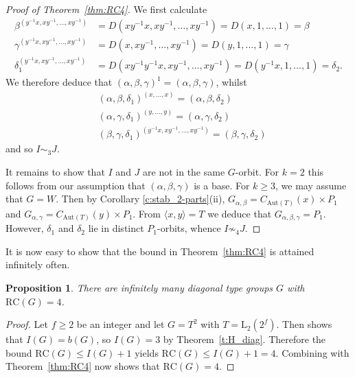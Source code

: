 \documentclass[twoside,a4paper,reqno,11pt]{amsart}
\newcommand{\RC}{\mathrm{RC}}
\renewcommand{\b}{\beta}
\newcommand{\g}{\gamma}
\newcommand{\<}{\langle}
\renewcommand{\>}{\rangle}
\newcommand{\leqs}{\leqslant}
\newcommand{\geqs}{\geqslant}
\newtheorem{prop}[thm]{Proposition}
\theoremstyle{definition}
\begin{document}
\begin{proof}[Proof of Theorem~\ref{thm:RC4}]
    We first calculate
	\begin{equation*}
	\begin{aligned}
	\b^{(y^{-1}x,xy^{-1},\dots,xy^{-1})} &= D(xy^{-1}x,xy^{-1},\dots,xy^{-1}) = D(x,1,\dots,1) = \b\\
	\g^{(y^{-1}x,xy^{-1},\dots,xy^{-1})} &= D(x,xy^{-1},\dots,xy^{-1}) = D(y,1,\dots,1) = \g\\
	\delta_1^{(y^{-1}x,xy^{-1},\dots,xy^{-1})} &= D(xy^{-1}y^{-1}x,xy^{-1},\dots,xy^{-1}) = D(y^{-1}x,1,\dots,1) = \delta_2.
	\end{aligned}
	\end{equation*}
    We therefore deduce that $(\alpha, \beta, \gamma)^1 = (\alpha, \beta, \gamma)$, whilst
	\begin{equation*}%
	\begin{aligned}
	&(\alpha,\beta,\delta_1)^{(x,\dots,x)}  = (\alpha,\beta,\delta_2)\\
	&(\alpha,\gamma,\delta_1)^{(y,\dots,y)} = (\alpha,\gamma,\delta_2)\\
	&(\beta,\gamma,\delta_1)^{(y^{-1}x,xy^{-1},\dots,xy^{-1})} = (\beta,\gamma,\delta_2)
	\end{aligned}
	\end{equation*}
    and so $I \sim_3 J$. 
	
    It remains to show that $I$ and $J$ are not in the same $G$-orbit. For $k = 2$ this follows from 
    our assumption that $(\alpha, \beta, \gamma)$ is a base. For $k \geqs 3$, we may assume that
    $G = W$. Then by Corollary \ref{c:stab_2-parts}(ii), $G_{\alpha, \beta} = C_{\mathrm{Aut}(T)}(x)\times P_1$ and $G_{\alpha,\gamma} = C_{\mathrm{Aut}(T)}(y)\times P_1$. From $\langle x,y\rangle = T$ we deduce that $G_{\alpha,\beta,\gamma} = P_1$. However, $\delta_1$ and $\delta_2$ lie in distinct $P_1$-orbits, whence $I \not\sim_4 J$.
\end{proof}

It is now easy to show that the bound in Theorem~\ref{thm:RC4} is attained infinitely often.

\begin{prop}
	\label{p:RC4_inf}
	There are infinitely many diagonal type groups $G$ with $\mathrm{RC}(G) = 4$.
\end{prop}

\begin{proof}
	Let $f\geqslant 2$ be an integer and let $G = T^2$ with $T = \mathrm{L}_2(2^f)$. Then \cite[Theorem~1.1]{LMM_ibis} shows that $I(G)= b(G)$, so $I(G)  = 3$ by Theorem~\ref{t:H_diag}. Therefore the bound $\RC(G) \leqs I(G) + 1$ yields  $\mathrm{RC}(G) \leqslant I(G) + 1 = 4$. Combining with Theorem~\ref{thm:RC4} now shows that $\mathrm{RC}(G) = 4$.
\end{proof}
\end{document}
